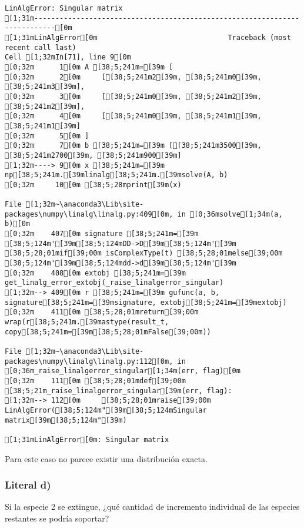 \documentclass[
  letterpaper,
  DIV=11,
  numbers=noendperiod]{scrartcl}
\begin{document}
\begin{verbatim}
LinAlgError: Singular matrix
[1;31m---------------------------------------------------------------------------[0m
[1;31mLinAlgError[0m                               Traceback (most recent call last)
Cell [1;32mIn[71], line 9[0m
[0;32m      1[0m A [38;5;241m=[39m [
[0;32m      2[0m     [[38;5;241m2[39m, [38;5;241m0[39m, [38;5;241m3[39m],
[0;32m      3[0m     [[38;5;241m0[39m, [38;5;241m2[39m, [38;5;241m2[39m],
[0;32m      4[0m     [[38;5;241m0[39m, [38;5;241m1[39m, [38;5;241m1[39m]
[0;32m      5[0m ]
[0;32m      7[0m b [38;5;241m=[39m [[38;5;241m3500[39m, [38;5;241m2700[39m, [38;5;241m900[39m]
[1;32m----> 9[0m x [38;5;241m=[39m np[38;5;241m.[39mlinalg[38;5;241m.[39msolve(A, b)
[0;32m     10[0m [38;5;28mprint[39m(x)

File [1;32m~\anaconda3\Lib\site-packages\numpy\linalg\linalg.py:409[0m, in [0;36msolve[1;34m(a, b)[0m
[0;32m    407[0m signature [38;5;241m=[39m [38;5;124m'[39m[38;5;124mDD->D[39m[38;5;124m'[39m [38;5;28;01mif[39;00m isComplexType(t) [38;5;28;01melse[39;00m [38;5;124m'[39m[38;5;124mdd->d[39m[38;5;124m'[39m
[0;32m    408[0m extobj [38;5;241m=[39m get_linalg_error_extobj(_raise_linalgerror_singular)
[1;32m--> 409[0m r [38;5;241m=[39m gufunc(a, b, signature[38;5;241m=[39msignature, extobj[38;5;241m=[39mextobj)
[0;32m    411[0m [38;5;28;01mreturn[39;00m wrap(r[38;5;241m.[39mastype(result_t, copy[38;5;241m=[39m[38;5;28;01mFalse[39;00m))

File [1;32m~\anaconda3\Lib\site-packages\numpy\linalg\linalg.py:112[0m, in [0;36m_raise_linalgerror_singular[1;34m(err, flag)[0m
[0;32m    111[0m [38;5;28;01mdef[39;00m [38;5;21m_raise_linalgerror_singular[39m(err, flag):
[1;32m--> 112[0m     [38;5;28;01mraise[39;00m LinAlgError([38;5;124m"[39m[38;5;124mSingular matrix[39m[38;5;124m"[39m)

[1;31mLinAlgError[0m: Singular matrix
\end{verbatim}

Para este caso no parece existir una distribución exacta.

\subsubsection{Literal d)}\label{literal-d-3}

Si la especie 2 se extingue, ¿qué cantidad de incremento individual de
las especies restantes se podría soportar?
\end{document}
